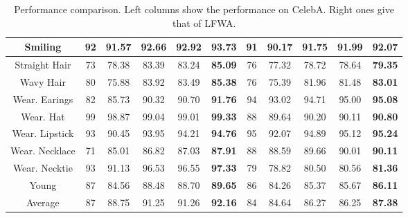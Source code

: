 \documentclass[wcp]{jmlr}
\begin{document}
\begin{table}
\begin{center}
\begin{tabular}{c|c|c|c|c|c||c|c|c|c|c|}
				\hline
				Smiling & 92 & 91.57 & 92.66 & 92.92 & \textbf{93.73} & 91 & 90.17 & 91.75 & 91.99 & \textbf{92.07} \\
				\hline
				Straight Hair & 73 & 78.38 & 83.39 & 83.24 & \textbf{85.09} & 76 & 77.32 & 78.72 & 78.64 & \textbf{79.35} \\
				\hline
				Wavy Hair & 80 & 75.88 & 83.92 & 83.49 & \textbf{85.38} & 76 & 75.39 & 81.96 & 81.48 & \textbf{83.01} \\
				\hline
				Wear. Earings & 82 & 85.73 & 90.32 & 90.70 & \textbf{91.76} & 94 & 93.02 & 94.71 & 95.00 & \textbf{95.08} \\
				\hline
				Wear. Hat & 99 & 98.87 & 99.04 & 99.01 & \textbf{99.33} & 88 & 89.64 & 90.20 & 90.11 & \textbf{90.80} \\
				\hline
				Wear. Lipstick & 93 & 90.45 & 93.95 & 94.21 & \textbf{94.76} & 95 & 92.07 & 94.89 & 95.12 & \textbf{95.24} \\
				\hline
				Wear. Necklace & 71 & 85.01 & 86.82 & 87.03 & \textbf{87.91} & 88 & 88.59 & 89.66 & 90.01 & \textbf{90.11} \\
				\hline
				Wear. Necktie & 93 & 91.13 & 96.53 & 96.55 & \textbf{97.33} & 79 & 78.82 & 80.50 & 80.56 & \textbf{81.36} \\
				\hline
				Young & 87 & 84.56 & 88.48 & 88.70 & \textbf{89.65} & 86 & 84.26 & 85.37 & 85.67 & \textbf{86.11} \\
				\hline
				Average& 87 & 88.75 & 91.25 & 91.26 & \textbf{92.16} & 84 & 84.64 & 86.27 & 86.25 & \textbf{87.38} \\
				\hline
			\end{tabular}
		\end{center}
		\caption{Performance comparison. Left columns show the performance on CelebA. Right ones give that of LFWA.}
		\label{results}
	\end{table}
	
\end{document}
